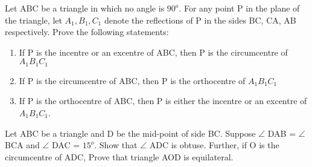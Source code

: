 \item Let ABC be a triangle in which no angle is $90^{o}$. For any point P in the plane of the triangle, let $A_1, B_1, C_1$ denote the reflections of P in the sides BC, CA, AB respectively. Prove the following statements:
\begin{enumerate}
\item If P is the incentre or an excentre of ABC, then P is the circumcentre of $A_1B_1C_1$
\item If P is the circumcentre of ABC, then P is the orthocentre of $A_1B_1C_1$
\item If P is the orthocentre of ABC, then P is either the incentre or an excentre of
$A_1B_1C_1$.
\end{enumerate}

\item Let ABC be a triangle and D be the mid-point of side BC. Suppose $\angle$ DAB = $\angle$ BCA and $\angle$ DAC = $15^{o}$. Show that $\angle$ ADC is obtuse. Further, if O is the circumcentre of ADC, Prove that triangle AOD is equilateral.






















